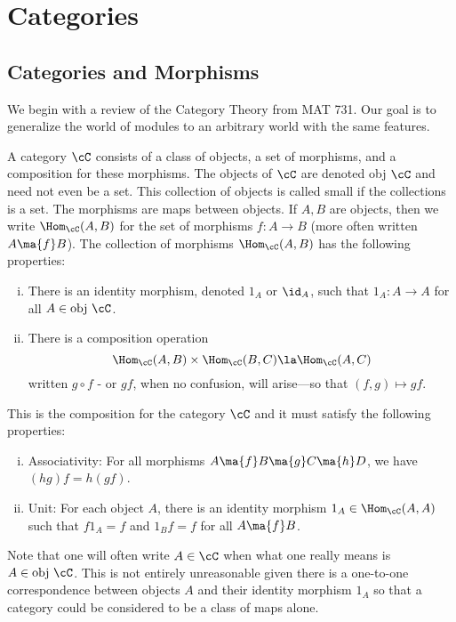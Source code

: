 \newpage
\section{Categories} 
\subsection{Categories and Morphisms}

We begin with a review of the Category Theory from MAT 731. Our goal is to generalize the world of modules to an arbitrary world with the same features. 

\begin{dfn}[Category]
A category $\cC$ consists of a class of objects, a set of morphisms, and a composition for these morphisms. The objects of $\cC$ are denoted obj $\cC$ and need not even be a set. This collection of objects is called small if the collections is a set. The morphisms are maps between objects. If $A,B$ are objects, then we write $\Hom_{\cC}(A,B)$ for the set of morphisms $f: A \rightarrow B$ (more often written $A \ma{f} B$). The collection of morphisms $\Hom_{\cC}(A,B)$ has the following properties:
	\begin{enumerate}[(i)]
	\item There is an identity morphism, denoted $1_A$ or $\id_A$, such that $1_A: A \rightarrow A$ for all $A \in \text{obj } \cC$. 
	\item There is a composition operation
		\[
		\Hom_{\cC}(A,B) \times \Hom_{\cC}(B,C) \la \Hom_{\cC}(A,C)
		\]
written $g \circ f$ - or $gf$, when no confusion, will arise---so that $(f,g) \mapsto gf$. 
	\end{enumerate}
This is the composition for the category $\cC$ and it must satisfy the following properties:
	\begin{enumerate}[(i)]
	\item Associativity: For all morphisms $A \ma{f} B \ma{g} C \ma{h} D$, we have $(hg)f=h(gf)$.
	\item Unit: For each object $A$, there is an identity morphism $1_A \in \Hom_{\cC}(A,A)$ such that $f 1_A=f$ and $1_Bf=f$ for all $A \ma{f} B$. 
	\end{enumerate}
\end{dfn}


\begin{rem}
Note that one will often write $A \in \cC$ when what one really means is $A \in \text{obj } \cC$. This is not entirely unreasonable given there is a one-to-one correspondence between objects $A$ and their identity morphism $1_A$ so that a category could be considered to be a class of maps alone. 
\end{rem}


